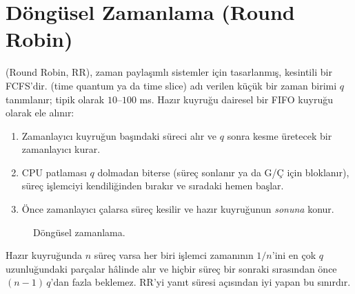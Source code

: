 \section{Döngüsel Zamanlama (Round Robin)}

 (Round Robin, RR), zaman paylaşımlı sistemler için tasarlanmış, kesintili bir FCFS'dir.  (time quantum ya da time slice) adı verilen küçük bir zaman birimi $q$ tanımlanır; tipik olarak $10$--$100$ ms. Hazır kuyruğu dairesel bir FIFO kuyruğu olarak ele alınır:
\begin{enumerate}[leftmargin=1.4em]
  \item Zamanlayıcı kuyruğun başındaki süreci alır ve $q$ sonra kesme üretecek bir zamanlayıcı kurar.
  \item CPU patlaması $q$ dolmadan biterse (süreç sonlanır ya da G/Ç için bloklanır), süreç işlemciyi kendiliğinden bırakır ve sıradaki hemen başlar.
  \item Önce zamanlayıcı çalarsa süreç kesilir ve hazır kuyruğunun \emph{sonuna} konur.
\end{enumerate}

\begin{figure}[H]
\centering
{}
\caption{Döngüsel zamanlama.}
\end{figure}

Hazır kuyruğunda $n$ süreç varsa her biri işlemci zamanının $1/n$'ini en çok $q$ uzunluğundaki parçalar hâlinde alır ve hiçbir süreç bir sonraki sırasından önce $(n-1)\,q$'dan fazla beklemez. RR'yi yanıt süresi açısından iyi yapan bu sınırdır.

